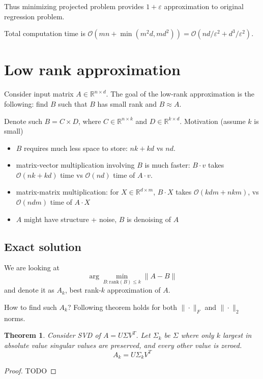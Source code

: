 \documentclass[11pt]{article}
\newtheorem{theorem}{Theorem}
\newcommand{\bigo}{\mathcal{O}}
\begin{document}
Thus minimizing projected problem provides $1+\varepsilon$ approximation to original regression problem.

Total computation time is $\bigo(mn + \min(m^2d,md^2)) = \bigo(nd/\varepsilon^2 + d^3 / \varepsilon^2)$.

\section{Low rank approximation}
Consider input matrix $A \in \mathbb{R}^{n \times d}$. The goal of the low-rank approximation is the following:
find $B$ such that  $B$ has small rank and $B \approx A$.

Denote such $B = C \times D$, where $C \in \mathbb{R}^{n \times k}$ and $D \in \mathbb{R}^{k \times d}$. Motivation (assume $k$ is small)
\begin{itemize}
\item $B$ requires much less space to store: $nk + kd$ vs $nd$.
\item matrix-vector  multiplication involving $B$ is much faster: $B \cdot v$ takes $\bigo(nk + kd)$ time vs $\bigo(nd)$ time of $A \cdot v$.
\item matrix-matrix multiplication: for $X \in \mathbb{R}^{d \times m}$, $B \cdot X$ takes $\bigo(kdm + nkm)$, vs $\bigo(ndm)$ time  of $A \cdot X$
\item $A$ might have structure + noise, $B$ is denoising of $A$
\end{itemize}
\subsection{Exact solution}
We are looking at
$$ \arg \min_{B : \textrm{rank}(B)\le k} \|A-B\|$$ 
and denote it as $A_k$, best rank-$k$ approximation of $A$.

How to find such $A_k$? Following theorem holds for both $\|\cdot\|_F$ and $\|\cdot\|_2$ norms.



\begin{theorem}
Consider SVD of $A = U \Sigma V^T$. Let $\Sigma_k$ be $\Sigma$ where only $k$ largest in absolute value singular values are preserved, and every other value is zeroed.
\begin{equation}
\label{eq:bestrankk}
A_k = U \Sigma_k V^T
\end{equation}
\end{theorem}
\begin{proof}
TODO
\end{proof}
\end{document}
